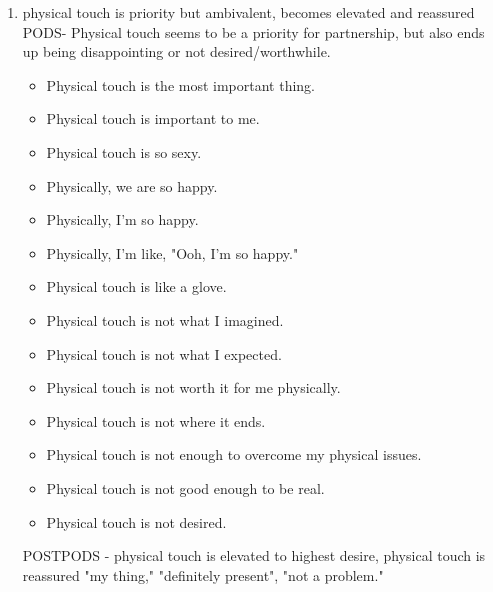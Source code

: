 \documentclass[11pt]{article}
\begin{document}
\begin{enumerate}
\begin{enumerate}
\item physical touch is priority but ambivalent, becomes elevated and reassured
\label{sec:org8905e35}
PODS- Physical touch seems to be a priority for partnership, but also
ends up being disappointing or not desired/worthwhile.

\begin{itemize}
\item Physical touch is the most important thing.
\item Physical touch is important to me.
\item Physical touch is so sexy.
\item Physically, we are so happy.
\item Physically, I'm so happy.
\item Physically, I'm like, "Ooh, I'm so happy."
\item Physical touch is like a glove.

\item Physical touch is not what I imagined.
\item Physical touch is not what I expected.
\item Physical touch is not worth it for me physically.
\item Physical touch is not where it ends.
\item Physical touch is not enough to overcome my physical issues.
\item Physical touch is not good enough to be real.
\item Physical touch is not desired.
\end{itemize}

POSTPODS - physical touch is elevated to highest desire, physical
touch is reassured "my thing," "definitely present", "not a problem." 


\end{enumerate}
\end{enumerate}
\end{document}
